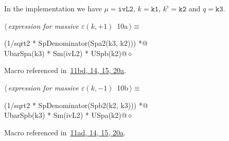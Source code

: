\documentclass[a4paper,12pt]{amsart}
\renewcommand{\NWtarget}[2]{\hypertarget{#1}{#2}}
\renewcommand{\NWlink}[2]{\hyperlink{#1}{#2}}
\renewcommand{\NWtxtMacroRefIn}{Macro referenced in}
\renewcommand{\NWsep}{${\diamond}$}
\begin{document}
In the implementation we have $\mu=\mathtt{ivL2}$, $k=\mathtt{k1}$,
$k^\flat=\mathtt{k2}$ and $q=\mathtt{k3}$.
\begin{flushleft} \small
\begin{minipage}{\linewidth}\label{scrap24}\raggedright\small
\NWtarget{nuweb10a}{} $\langle\,${\itshape expression for massive $\varepsilon(k, +1)$}\nobreak\ {\footnotesize {10a}}$\,\rangle\equiv$
\vspace{-1ex}
\begin{list}{}{} \item
\mbox{}\verb@(1/sqrt2 * SpDenominator(Spa2(k3, k2))) *@\\
\mbox{}\verb@   UbarSpa(k3) * Sm(ivL2) * USpb(k2)@{\NWsep}
\end{list}
\vspace{-1.5ex}
\footnotesize
\begin{list}{}{\setlength{\itemsep}{-\parsep}\setlength{\itemindent}{-\leftmargin}}
\item \NWtxtMacroRefIn\ \NWlink{nuweb11b}{11b}\NWlink{nuweb11d}{d}\NWlink{nuweb14}{, 14}\NWlink{nuweb15}{, 15}\NWlink{nuweb20a}{, 20a}.

\item{}
\end{list}
\end{minipage}\vspace{4ex}
\end{flushleft}
\begin{flushleft} \small
\begin{minipage}{\linewidth}\label{scrap25}\raggedright\small
\NWtarget{nuweb10b}{} $\langle\,${\itshape expression for massive $\varepsilon(k, -1)$}\nobreak\ {\footnotesize {10b}}$\,\rangle\equiv$
\vspace{-1ex}
\begin{list}{}{} \item
\mbox{}\verb@(1/sqrt2 * SpDenominator(Spb2(k2, k3))) *@\\
\mbox{}\verb@   UbarSpb(k3) * Sm(ivL2) * USpa(k2)@{\NWsep}
\end{list}
\vspace{-1.5ex}
\footnotesize
\begin{list}{}{\setlength{\itemsep}{-\parsep}\setlength{\itemindent}{-\leftmargin}}
\item \NWtxtMacroRefIn\ \NWlink{nuweb11a}{11a}\NWlink{nuweb11d}{d}\NWlink{nuweb14}{, 14}\NWlink{nuweb15}{, 15}\NWlink{nuweb20a}{, 20a}.

\item{}
\end{list}
\end{minipage}\vspace{4ex}
\end{flushleft}
\end{document}
